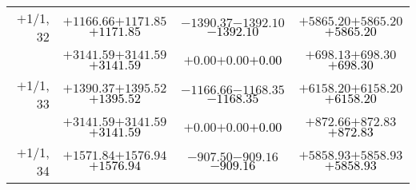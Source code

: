 \documentclass[compress]{beamer}
\begin{document}
\begin{frame}
{\begin{tabular}{r | c | c | c}
$+$1/1, 32 & $+1166.66$\hspace{0.1 cm}$+1171.85$\hspace{0.1 cm}\textcolor{black}{$+1171.85$} & $-1390.37$\hspace{0.1 cm}$-1392.10$\hspace{0.1 cm}\textcolor{black}{$-1392.10$} & $+5865.20$\hspace{0.1 cm}$+5865.20$\hspace{0.1 cm}\textcolor{black}{$+5865.20$} \\
           & $+3141.59$\hspace{0.1 cm}$+3141.59$\hspace{0.1 cm}\textcolor{black}{$+3141.59$} & $+0.00$\hspace{0.1 cm}$+0.00$\hspace{0.1 cm}\textcolor{black}{$+0.00$} & $+698.13$\hspace{0.1 cm}$+698.30$\hspace{0.1 cm}\textcolor{black}{$+698.30$} \\
$+$1/1, 33 & $+1390.37$\hspace{0.1 cm}$+1395.52$\hspace{0.1 cm}\textcolor{black}{$+1395.52$} & $-1166.66$\hspace{0.1 cm}$-1168.35$\hspace{0.1 cm}\textcolor{black}{$-1168.35$} & $+6158.20$\hspace{0.1 cm}$+6158.20$\hspace{0.1 cm}\textcolor{black}{$+6158.20$} \\
           & $+3141.59$\hspace{0.1 cm}$+3141.59$\hspace{0.1 cm}\textcolor{black}{$+3141.59$} & $+0.00$\hspace{0.1 cm}$+0.00$\hspace{0.1 cm}\textcolor{black}{$+0.00$} & $+872.66$\hspace{0.1 cm}$+872.83$\hspace{0.1 cm}\textcolor{black}{$+872.83$} \\
$+$1/1, 34 & $+1571.84$\hspace{0.1 cm}$+1576.94$\hspace{0.1 cm}\textcolor{black}{$+1576.94$} & $-907.50$\hspace{0.1 cm}$-909.16$\hspace{0.1 cm}\textcolor{black}{$-909.16$} & $+5858.93$\hspace{0.1 cm}$+5858.93$\hspace{0.1 cm}\textcolor{black}{$+5858.93$} \\

\end{tabular}}
\end{frame}
\end{document}
